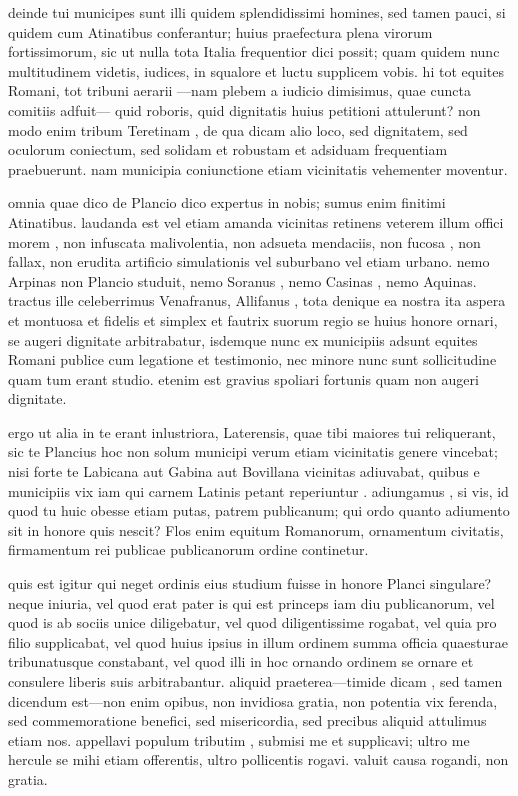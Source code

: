  deinde tui municipes sunt illi quidem splendidissimi homines, sed tamen pauci, si quidem cum Atinatibus conferantur; huius praefectura plena virorum fortissimorum, sic ut nulla tota Italia frequentior dici possit; quam quidem nunc multitudinem videtis, iudices, in squalore et luctu supplicem vobis. hi tot equites Romani, tot tribuni aerarii —nam plebem a iudicio dimisimus, quae cuncta comitiis adfuit— quid roboris, quid dignitatis huius petitioni attulerunt? non modo enim tribum Teretinam , de qua dicam alio loco, sed dignitatem, sed oculorum coniectum, sed solidam et robustam et adsiduam frequentiam praebuerunt. nam municipia coniunctione etiam vicinitatis vehementer moventur.

 omnia quae dico de Plancio dico expertus in nobis; sumus enim finitimi Atinatibus. laudanda est vel etiam amanda vicinitas retinens veterem illum offici morem , non infuscata malivolentia, non adsueta mendaciis, non fucosa , non fallax, non erudita artificio simulationis vel suburbano vel etiam urbano. nemo Arpinas non Plancio studuit, nemo Soranus , nemo Casinas , nemo Aquinas. tractus ille celeberrimus Venafranus, Allifanus , tota denique ea nostra ita aspera et montuosa et fidelis et simplex et fautrix suorum regio se huius honore ornari, se augeri dignitate arbitrabatur, isdemque nunc ex municipiis adsunt equites Romani publice cum legatione et testimonio, nec minore nunc sunt sollicitudine quam tum erant studio. etenim est gravius spoliari fortunis quam non augeri dignitate.

 ergo ut alia in te erant inlustriora, Laterensis, quae tibi maiores tui reliquerant, sic te Plancius hoc non solum municipi verum etiam vicinitatis genere vincebat; nisi forte te Labicana aut Gabina aut Bovillana vicinitas adiuvabat, quibus e municipiis vix iam qui carnem Latinis petant reperiuntur . adiungamus , si vis, id quod tu huic obesse etiam putas, patrem publicanum; qui ordo quanto adiumento sit in honore quis nescit? Flos enim equitum Romanorum, ornamentum civitatis, firmamentum rei publicae publicanorum ordine continetur.

 quis est igitur qui neget ordinis eius studium fuisse in honore Planci singulare? neque iniuria, vel quod erat pater is qui est princeps iam diu publicanorum, vel quod is ab sociis unice diligebatur, vel quod diligentissime rogabat, vel quia pro filio supplicabat, vel quod huius ipsius in illum ordinem summa officia quaesturae tribunatusque constabant, vel quod illi in hoc ornando ordinem se ornare et consulere liberis suis arbitrabantur. aliquid praeterea—timide dicam , sed tamen dicendum est—non enim opibus, non invidiosa gratia, non potentia vix ferenda, sed commemoratione benefici, sed misericordia, sed precibus aliquid attulimus etiam nos. appellavi populum tributim , submisi me et supplicavi; ultro me hercule se mihi etiam offerentis, ultro pollicentis rogavi. valuit causa rogandi, non gratia.

